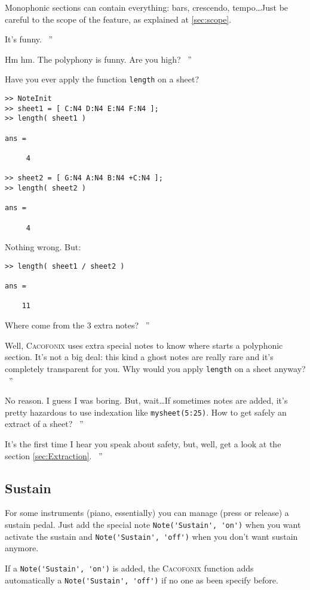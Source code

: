 \documentclass{article}
\newcommand\cacofonix{\textsc{Cacofonix}\xspace}
\newenvironment{meenv}{ \par \noindent \makebox[6em][r]{ \textcolor{mecolor}{Me}: `` --~}}{~''}
\newenvironment{myselfenv}{ \par \noindent \makebox[6em][r]{ \textcolor{myselfcolor}{Myself}: `` --~}}{~''}
\newcommand{ \me }[1]{%
\begin{meenv}%
	#1%
\end{meenv} }
\newcommand{ \myself }[1]{%
\begin{myselfenv}%
	#1%
\end{myselfenv} }
\begin{document}
Monophonic sections can contain everything: bars, crescendo, tempo\dots Just be careful to the scope of the feature, as explained at \ref{sec:scope}.

\me{It's funny.}
\myself{Hm hm. The polyphony is funny. Are you high?}
\begin{meenv}%
Have you ever apply the function \lstinline!length! on a sheet?
\begin{lstlisting}
>> NoteInit
>> sheet1 = [ C:N4 D:N4 E:N4 F:N4 ];
>> length( sheet1 )

ans =

     4

>> sheet2 = [ G:N4 A:N4 B:N4 +C:N4 ];
>> length( sheet2 )

ans =

     4

\end{lstlisting}
Nothing wrong. But:
\begin{lstlisting}
>> length( sheet1 / sheet2 )

ans =

    11

\end{lstlisting}
Where come from the $3$ extra notes?%
\end{meenv}
\myself{Well, \cacofonix uses extra special notes to know where starts a polyphonic section. It's not a big deal: this kind a ghost notes are really rare and it's completely transparent for you. Why would you apply \lstinline!length! on a sheet anyway?}
\begin{meenv}%
No reason. I guess I was boring. But, wait\dots If sometimes notes are added, it's pretty hazardous to use indexation like \lstinline!mysheet(5:25)!. How to get safely an extract of a sheet?%
\end{meenv}
\myself{It's the first time I hear you speak about safety, but, well, get a look at the section \ref{sec:Extraction}.} 

\subsection{Sustain}
\label{sec:Sustain}

For some instruments (piano, essentially) you can manage (press or release) a sustain pedal. Just add the special note \lstinline!Note('Sustain', 'on')! when you want activate the sustain and \lstinline!Note('Sustain', 'off')! when you don't want sustain anymore.

If a \lstinline!Note('Sustain', 'on')! is added, the \cacofonix function adds automatically a \lstinline!Note('Sustain', 'off')! if no one as been specify before.
\end{document}

